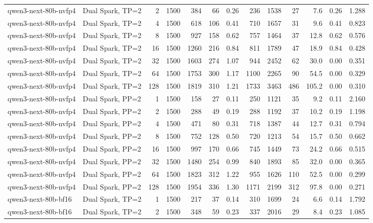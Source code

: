 \begin{tabular}{l l r r r r r r r r r r r}
qwen3-next-80b-nvfp4 & Dual Spark, TP=2 & 2 & 1500 & 384 & 66 & 0.26 & 236 & 1538 & 27 & 7.6 & 0.26 & 1.288 \\
qwen3-next-80b-nvfp4 & Dual Spark, TP=2 & 4 & 1500 & 618 & 106 & 0.41 & 710 & 1657 & 31 & 9.6 & 0.41 & 0.823 \\
qwen3-next-80b-nvfp4 & Dual Spark, TP=2 & 8 & 1500 & 927 & 158 & 0.62 & 757 & 1464 & 37 & 12.8 & 0.62 & 0.576 \\
qwen3-next-80b-nvfp4 & Dual Spark, TP=2 & 16 & 1500 & 1260 & 216 & 0.84 & 811 & 1789 & 47 & 18.9 & 0.84 & 0.428 \\
qwen3-next-80b-nvfp4 & Dual Spark, TP=2 & 32 & 1500 & 1603 & 274 & 1.07 & 944 & 2452 & 62 & 30.0 & 0.00 & 0.351 \\
qwen3-next-80b-nvfp4 & Dual Spark, TP=2 & 64 & 1500 & 1753 & 300 & 1.17 & 1100 & 2265 & 90 & 54.5 & 0.00 & 0.329 \\
qwen3-next-80b-nvfp4 & Dual Spark, TP=2 & 128 & 1500 & 1819 & 310 & 1.21 & 1733 & 3463 & 486 & 105.2 & 0.00 & 0.310 \\
\addlinespace
qwen3-next-80b-nvfp4 & Dual Spark, PP=2 & 1 & 1500 & 158 & 27 & 0.11 & 250 & 1121 & 35 & 9.2 & 0.11 & 2.160 \\
qwen3-next-80b-nvfp4 & Dual Spark, PP=2 & 2 & 1500 & 288 & 49 & 0.19 & 288 & 1192 & 37 & 10.2 & 0.19 & 1.198 \\
qwen3-next-80b-nvfp4 & Dual Spark, PP=2 & 4 & 1500 & 471 & 80 & 0.31 & 718 & 1387 & 44 & 12.7 & 0.31 & 0.794 \\
qwen3-next-80b-nvfp4 & Dual Spark, PP=2 & 8 & 1500 & 752 & 128 & 0.50 & 720 & 1213 & 54 & 15.7 & 0.50 & 0.662 \\
qwen3-next-80b-nvfp4 & Dual Spark, PP=2 & 16 & 1500 & 997 & 170 & 0.66 & 745 & 1449 & 73 & 24.2 & 0.66 & 0.515 \\
qwen3-next-80b-nvfp4 & Dual Spark, PP=2 & 32 & 1500 & 1480 & 254 & 0.99 & 840 & 1893 & 85 & 32.0 & 0.00 & 0.365 \\
qwen3-next-80b-nvfp4 & Dual Spark, PP=2 & 64 & 1500 & 1823 & 312 & 1.22 & 955 & 1626 & 110 & 52.5 & 0.00 & 0.299 \\
qwen3-next-80b-nvfp4 & Dual Spark, PP=2 & 128 & 1500 & 1954 & 336 & 1.30 & 1171 & 2199 & 312 & 97.8 & 0.00 & 0.271 \\
\addlinespace
qwen3-next-80b-bf16 & Dual Spark, TP=2 & 1 & 1500 & 217 & 37 & 0.14 & 310 & 1699 & 24 & 6.6 & 0.14 & 1.792 \\
qwen3-next-80b-bf16 & Dual Spark, TP=2 & 2 & 1500 & 348 & 59 & 0.23 & 337 & 2016 & 29 & 8.4 & 0.23 & 1.085 \\

\end{tabular}
